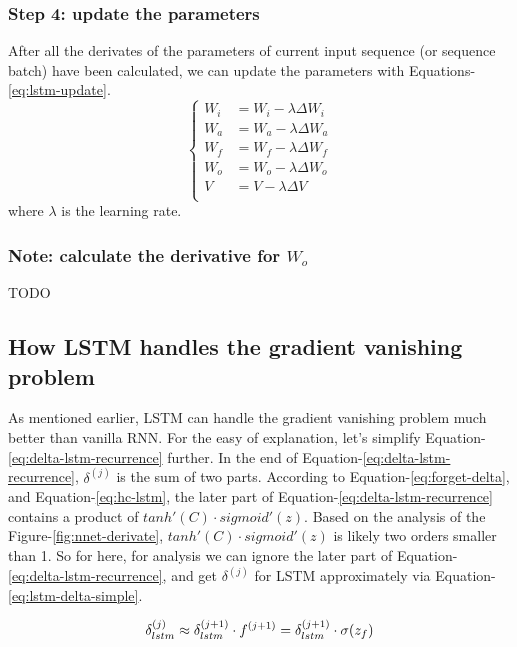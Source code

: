 \documentclass{article}
\begin{document}
\subsubsection{Step 4: update the parameters} 
After all the derivates of the parameters of current input sequence (or sequence batch) have been calculated, we can update the parameters with Equations-\ref{eq:lstm-update}.
\begin{equation}\label{eq:lstm-update}\begin{cases}
W_i &= W_i  - \lambda \Delta W_i\\
W_a &= W_a  - \lambda \Delta W_a\\
W_f &= W_f  - \lambda \Delta W_f\\
W_o &= W_o  - \lambda \Delta W_o\\
V &= V - \lambda \Delta V\\
\end{cases}\end{equation}
where $\lambda$ is the learning rate. 

\subsubsection{Note:  calculate the derivative for $W_o$} 
TODO

\subsection{How LSTM handles the gradient vanishing problem}
As mentioned earlier, LSTM can handle the gradient vanishing problem much better than vanilla RNN.  For the easy of explanation, let's simplify
Equation-\ref{eq:delta-lstm-recurrence} further. In the end of Equation-\ref{eq:delta-lstm-recurrence},  $\delta^{(j)}$ is the sum of two parts.  According 
to Equation-\ref{eq:forget-delta}, and Equation-\ref{eq:hc-lstm}, the later part of Equation-\ref{eq:delta-lstm-recurrence} contains a product of $tanh'(C) \cdot sigmoid'(z)$. Based on the analysis of the Figure-\ref{fig:nnet-derivate}, $tanh'(C) \cdot sigmoid'(z)$ is likely two orders smaller than 1. 
So for here, for analysis we can ignore the later part of Equation-\ref{eq:delta-lstm-recurrence}, and get $\delta^{(j)}$ for LSTM approximately via 
Equation-\ref{eq:lstm-delta-simple}.

\begin{equation}\label{eq:lstm-delta-simple}
\delta^{(j)}_{lstm}  \approx \delta^{(j+1)}_{lstm} \cdot f^{(j+1)} = \delta^{(j+1)}_{lstm} \cdot \sigma(z_f) \\
\end{equation}
\end{document}
